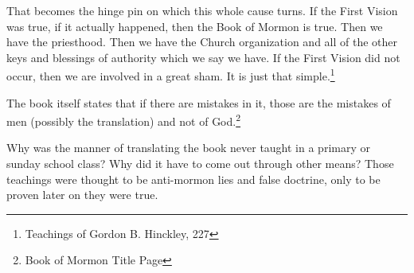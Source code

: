 \begin{displayquote}
That becomes the hinge pin on which this whole cause turns. If the First Vision 
was true, if it actually happened, then the Book of Mormon is true. Then we have 
the priesthood. Then we have the Church organization and all of the other keys 
and blessings of authority which we say we have. If the First Vision did not 
occur, then we are involved in a great sham. It is just that 
simple.\footnote{Teachings of Gordon B. Hinckley, 227}
\end{displayquote}

The book itself states that if there are mistakes in it, those are the mistakes of
men (possibly the translation) and not of God.\footnote{Book of Mormon Title Page}

Why was the manner of translating the book never taught in a primary or sunday school
class? Why did it have to come out through other means? Those teachings were thought
to be anti-mormon lies and false doctrine, only to be proven later on they were true.